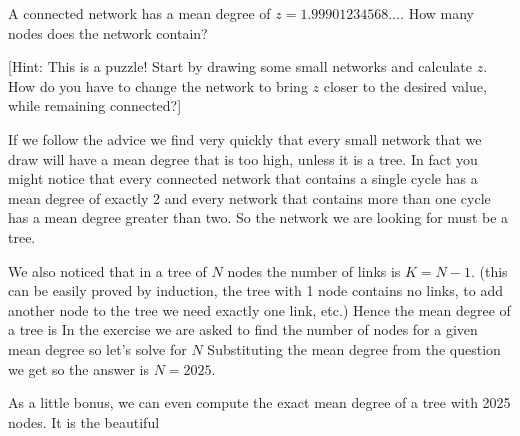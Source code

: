 
A connected network has a mean degree of 
$z=1.99901234568\ldots$. How many nodes does the network contain?

[Hint: This is a puzzle! Start by drawing some small networks and calculate $z$. How do you have to change the network to bring $z$ closer to the desired value, while remaining connected?]

\solution
If we follow the advice we find very quickly that every small network that we draw will have a mean degree that is too high, unless it is a tree. In fact you might notice that every connected network that contains a single cycle has a mean degree of exactly 2 and every network that contains more than one cycle has a mean degree greater than two. So the network we are looking for must be a tree. 

We also noticed that in a tree of $N$ nodes the number of links is $K=N-1$. 
(this can be easily proved by induction, the tree with 1 node contains no links, to add another node to the tree we need exactly one link, etc.)
Hence the mean degree of a tree is 
In the exercise we are asked to find the number of nodes for a given mean degree so let's solve for $N$
Substituting the mean degree from the question we get
so the answer is $N=2025$.  

As a little bonus, we can even compute the exact mean degree of a tree with 2025 nodes. It is the beautiful
\solutionend
